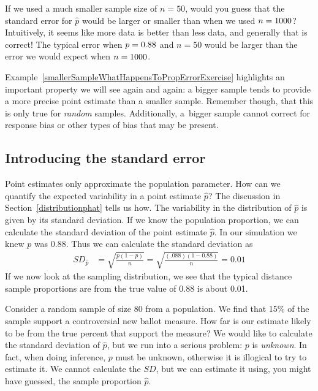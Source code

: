 \begin{examplewrap}
\begin{nexample}{If we used a much smaller sample size of $n = 50$,
would you guess that the standard error for $\hat{p}$ would be larger
or smaller than when we used $n = 1000{}$?}
\label{smallerSampleWhatHappensToPropErrorExercise}
Intuitively, it seems like more data is better
than less data, and generally that is correct! The typical error
when $p = 0.88{}$ and $n = 50$ would be larger
than the error we would expect when $n = 1000{}$.
\end{nexample}
\end{examplewrap}

Example~\ref{smallerSampleWhatHappensToPropErrorExercise}
highlights an important property we will see again and again:
a bigger sample tends to provide a more precise point estimate
than a smaller sample.
Remember though, that this is only true for \emph{random} samples.
Additionally, a~bigger sample cannot correct for response bias or other types of bias that may be present.


\D{\newpage}

\subsection{Introducing the standard error}

Point estimates only approximate the population parameter.  How can we quantify the expected variability in a point estimate $\hat{p}$? The discussion in Section~\ref{distributionphat} tells us how. The variability in the distribution of $\hat{p}$ is given by its standard deviation. If we know the population proportion, we can calculate the standard deviation of the point estimate $\hat{p}$.  In our simulation we knew $p$ was 0.88.  Thus we can calculate the standard deviation as 
\begin{align*}
SD_{\hat{p}}&=\sqrt{\frac{p(1-p)}{n}} = \sqrt{\frac{(.088)(1-0.88)}{n}}= 0.01
\end{align*}
If we now look at the sampling distribution, we see that the typical distance sample proportions are from the true value of 0.88 is about 0.01.

\begin{examplewrap}
\begin{nexample}{Consider a random sample of size 80 from a population.  We find that 15\% of the sample support a controversial new ballot measure.  How far is our estimate likely to be from the true percent that support the measure?}  We would like to calculate the standard deviation of $\hat{p}$, but we run into a serious problem: $p$ is \emph{unknown}. In fact, when doing inference, $p$ must be unknown, otherwise it is illogical to try to estimate it. We cannot calculate the $SD$, but we can estimate it using, you might have guessed, the sample proportion $\hat{p}$.
\end{nexample}
\end{examplewrap}
 
